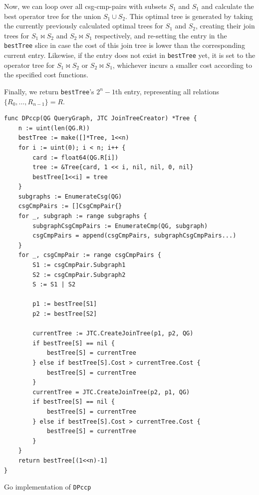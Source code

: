 Now, we can loop over all csg-cmp-pairs with subsets $S_1$ and $S_1$ and calculate the best operator tree for the union $S_1 \cup S_2$. This optimal tree is generated by taking the currently previously calculated optimal trees for $S_1$ and $S_2$, creating their join trees for $S_1 \Join S_2$ and $S_2 \Join S_1$ respectively, and re-setting the entry in the \texttt{bestTree} slice in case the cost of this join tree is lower than the corresponding current entry. Likewise, if the entry does not exist in \texttt{bestTree} yet, it is set to the operator tree for $S_1 \Join S_2$ or $S_2 \Join S_1$, whichever incurs a smaller cost according to the specified cost functions.

Finally, we return \texttt{bestTree}'s $2^{n}-1$th entry, representing all relations $\{R_0,\ldots,R_{n-1}\} = R$.

\newpage

\begin{algorithm}[H]
\begin{verbatim}
func DPccp(QG QueryGraph, JTC JoinTreeCreator) *Tree {
    n := uint(len(QG.R))
    bestTree := make([]*Tree, 1<<n)
    for i := uint(0); i < n; i++ {
        card := float64(QG.R[i])
        tree := &Tree{card, 1 << i, nil, nil, 0, nil}
        bestTree[1<<i] = tree
    }
    subgraphs := EnumerateCsg(QG)
    csgCmpPairs := []CsgCmpPair{}
    for _, subgraph := range subgraphs {
        subgraphCsgCmpPairs := EnumerateCmp(QG, subgraph)
        csgCmpPairs = append(csgCmpPairs, subgraphCsgCmpPairs...)
    }
    for _, csgCmpPair := range csgCmpPairs {
        S1 := csgCmpPair.Subgraph1
        S2 := csgCmpPair.Subgraph2
        S := S1 | S2

        p1 := bestTree[S1]
        p2 := bestTree[S2]

        currentTree := JTC.CreateJoinTree(p1, p2, QG)
        if bestTree[S] == nil {
            bestTree[S] = currentTree
        } else if bestTree[S].Cost > currentTree.Cost {
            bestTree[S] = currentTree
        }
        currentTree = JTC.CreateJoinTree(p2, p1, QG)
        if bestTree[S] == nil {
            bestTree[S] = currentTree
        } else if bestTree[S].Cost > currentTree.Cost {
            bestTree[S] = currentTree
        }
    }
    return bestTree[(1<<n)-1]
}
\end{verbatim}
\caption{Go implementation of \texttt{DPccp}}
\label{alg:dpccp}
\end{algorithm}





